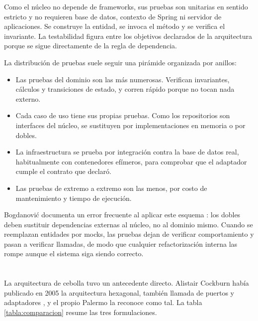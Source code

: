 \documentclass[10pt,a4paper]{article}
\begin{document}
Como el núcleo no depende de frameworks, sus pruebas son unitarias en sentido estricto y no requieren base de datos, contexto de Spring ni servidor de aplicaciones. Se construye la entidad, se invoca el método y se verifica el invariante. La testabilidad figura entre los objetivos declarados de la arquitectura \cite{martin2012} porque se sigue directamente de la regla de dependencia.

La distribución de pruebas suele seguir una pirámide organizada por anillos:

\begin{itemize}
	\item Las pruebas del dominio son las más numerosas. Verifican invariantes, cálculos y transiciones de estado, y corren rápido porque no tocan nada externo.
	\item Cada caso de uso tiene sus propias pruebas. Como los repositorios son interfaces del núcleo, se sustituyen por implementaciones en memoria o por dobles.
	\item La infraestructura se prueba por integración contra la base de datos real, habitualmente con contenedores efímeros, para comprobar que el adaptador cumple el contrato que declaró.
	\item Las pruebas de extremo a extremo son las menos, por costo de mantenimiento y tiempo de ejecución.
\end{itemize}

Bogdanović documenta un error frecuente al aplicar este esquema \cite{optivem2023}: los dobles deben sustituir dependencias externas al núcleo, no al dominio mismo. Cuando se reemplazan entidades por mocks, las pruebas dejan de verificar comportamiento y pasan a verificar llamadas, de modo que cualquier refactorización interna las rompe aunque el sistema siga siendo correcto.

\section{\color{colorIPN}{Análisis comparativo}}

\subsection{	\color{colorESCOM}{Tres nombres para la misma regla}}

La arquitectura de cebolla tuvo un antecedente directo. Alistair Cockburn había publicado en 2005 la arquitectura hexagonal, también llamada de puertos y adaptadores \cite{cockburn2005}, y el propio Palermo la reconoce como tal. La tabla \ref{tabla:comparacion} resume las tres formulaciones.
\end{document}
